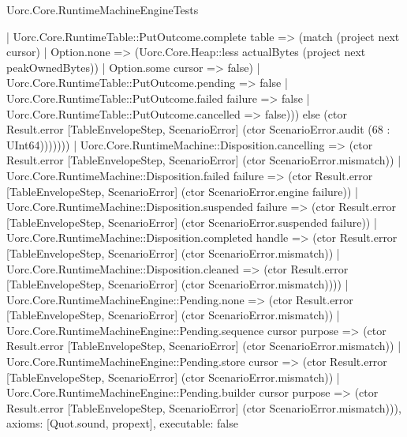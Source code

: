\begin{lexlean}{Uorc.Core.RuntimeMachineEngineTests}
\begin{semanticmodule}
{{          | Uorc.Core.RuntimeTable::PutOutcome.complete table => (match (project next cursor)
            | Option.none => (Uorc.Core.Heap::less actualBytes (project next peakOwnedBytes))
            | Option.some cursor => false)
          | Uorc.Core.RuntimeTable::PutOutcome.pending => false
          | Uorc.Core.RuntimeTable::PutOutcome.failed failure => false
          | Uorc.Core.RuntimeTable::PutOutcome.cancelled => false)})) else (ctor Result.error [TableEnvelopeStep, ScenarioError] (ctor ScenarioError.audit (68 : UInt64)))))))
      | Uorc.Core.RuntimeMachine::Disposition.cancelling => (ctor Result.error [TableEnvelopeStep, ScenarioError] (ctor ScenarioError.mismatch))
      | Uorc.Core.RuntimeMachine::Disposition.failed failure => (ctor Result.error [TableEnvelopeStep, ScenarioError] (ctor ScenarioError.engine failure))
      | Uorc.Core.RuntimeMachine::Disposition.suspended failure => (ctor Result.error [TableEnvelopeStep, ScenarioError] (ctor ScenarioError.suspended failure))
      | Uorc.Core.RuntimeMachine::Disposition.completed handle => (ctor Result.error [TableEnvelopeStep, ScenarioError] (ctor ScenarioError.mismatch))
      | Uorc.Core.RuntimeMachine::Disposition.cleaned => (ctor Result.error [TableEnvelopeStep, ScenarioError] (ctor ScenarioError.mismatch))))
    | Uorc.Core.RuntimeMachineEngine::Pending.none => (ctor Result.error [TableEnvelopeStep, ScenarioError] (ctor ScenarioError.mismatch))
    | Uorc.Core.RuntimeMachineEngine::Pending.sequence cursor purpose => (ctor Result.error [TableEnvelopeStep, ScenarioError] (ctor ScenarioError.mismatch))
    | Uorc.Core.RuntimeMachineEngine::Pending.store cursor => (ctor Result.error [TableEnvelopeStep, ScenarioError] (ctor ScenarioError.mismatch))
    | Uorc.Core.RuntimeMachineEngine::Pending.builder cursor purpose => (ctor Result.error [TableEnvelopeStep, ScenarioError] (ctor ScenarioError.mismatch))),
  axioms: [Quot.sound, propext],
  executable: false
}


\end{semanticmodule}
\end{lexlean}
